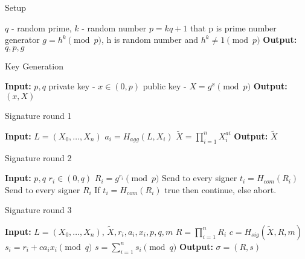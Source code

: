 \documentclass[a4paper,11pt]{article}
\begin{document}
\begin{algorithm}
	\caption{Setup}
	\begin{algorithmic}[1]
	    \State $q$ - random prime, $k$ - random number
	    \State $p = kq +1$ that p is prime number
	    \State generator $g = h^{k} \pmod{p}$, h is random number and $h^{k} \neq 1 \pmod{p}$
	    \State \textbf{Output:} $q, p, g$
	\end{algorithmic}
\end{algorithm}

\begin{algorithm}
	\caption{Key Generation}
	\begin{algorithmic}[1]
	    \State \textbf{Input:} $p, q$
	    \State private key - $x \in (0, p)$
	    \State public key - $X = g^{x} \pmod{p}$
	    \State \textbf{Output:} $(x, X)$
	\end{algorithmic}
\end{algorithm}


\begin{algorithm}
	\caption{Signature round 1}
	\begin{algorithmic}[1]
	    \State \textbf{Input:} $L = ( X_0, …, X_n)$
	        \State $a_i = H_{agg}(L, X_i)$
	        \State $ \tilde{X} = \prod_{i=1}^{n} X^{ai}_i $
	    \EndFor
	    \State \textbf{Output:} $\tilde{X}$
	\end{algorithmic}
\end{algorithm}


\begin{algorithm}
	\caption{Signature round 2}
	\begin{algorithmic}[1]
	    \State \textbf{Input:} $p, q$
	        \State $r_i \in (0, q)$
	        \State $R_i= g^{r_i} \pmod{p}$
	        \State Send to every signer $t_i = H_{com}(R_i)$
	    \EndFor
	        \State Send to every signer $R_i$
	    \EndFor
            \State If $t_i = H_{com} (R_i)$ true then continue, else abort.
	    \EndFor
	\end{algorithmic}
\end{algorithm}

\begin{algorithm}
	\caption{Signature round 3}
	\begin{algorithmic}[1]
	    \State \textbf{Input:} $L = ( X_0, …, X_n)$, $\tilde{X}, r_i, a_i, x_i, p, q, m$
	        \State $R = \prod_{i=1}^{n} R_i $
	        \State $c = H_{sig}(\tilde{X}, R,  m)$
	        \State $s_i = r_i + ca_ix_i \pmod{q}$
	    \EndFor
	    \State $s = \sum_{i=1}^{n} s_i \pmod{q}$
	    \State \textbf{Output:} $\sigma = (R, s)$
	\end{algorithmic}
\end{algorithm}
\end{document}
